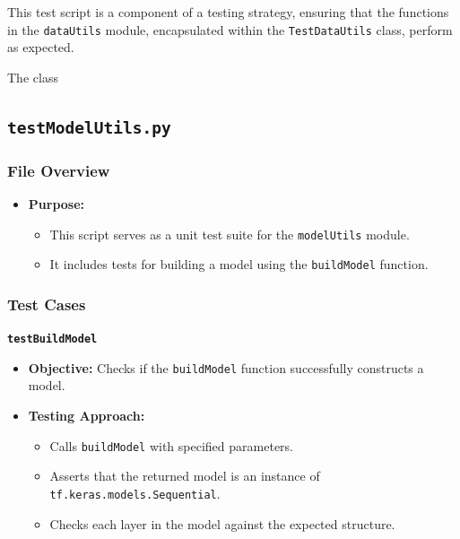 This test script is a component of a testing strategy, ensuring that the functions in the \texttt{dataUtils} module, encapsulated within the \texttt{TestDataUtils} class, perform as expected.

\begin{code}[h!]
	
	
	\caption{The  class}
	\label{code:TestDataUtils}
\end{code}


\subsection{\texttt{testModelUtils.py}}

\subsubsection{File Overview}

\begin{itemize}
	\item \textbf{Purpose:}
	\begin{itemize}
		\item This script serves as a unit test suite for the \texttt{modelUtils} module.
		\item It includes tests for building a model using the \texttt{buildModel} function.
	\end{itemize}
\end{itemize}

\subsubsection{Test Cases}

\textbf{\texttt{testBuildModel}}

\begin{itemize}
	\item \textbf{Objective:} Checks if the \texttt{buildModel} function successfully constructs a model.
	\item \textbf{Testing Approach:}
	\begin{itemize}
		\item Calls \texttt{buildModel} with specified parameters.
		\item Asserts that the returned model is an instance of \texttt{tf.keras.models.Sequential}.
		\item Checks each layer in the model against the expected structure.
	\end{itemize}
\end{itemize}


